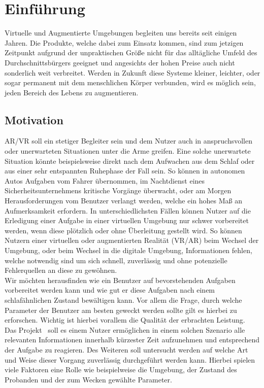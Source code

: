 \chapter{Einführung}

Virtuelle und Augmentierte Umgebungen begleiten uns bereits seit einigen Jahren.  Die Produkte, welche dabei zum Einsatz kommen, sind zum jetzigen Zeitpunkt aufgrund der unpraktischen Größe nicht für das alltägliche Umfeld des Durchschnittsbürgers geeignet und angesichts der hohen Preise auch nicht sonderlich weit verbreitet.
Werden in Zukunft diese Systeme kleiner, leichter, oder sogar permanent mit dem menschlichen Körper verbunden, wird es möglich sein, jeden Bereich des Lebens zu augmentieren. 

\section{Motivation}

AR/VR soll ein stetiger Begleiter sein und dem Nutzer auch in anspruchsvollen oder unerwarteten Situationen unter die Arme greifen.
Eine solche unerwartete Situation könnte beispielsweise direkt nach dem Aufwachen aus dem Schlaf oder aus einer sehr entspannten Ruhephase der Fall sein. So können in autonomen Autos Aufgaben vom Fahrer übernommen, im Nachtdienst eines Sicherheitsunternehmens kritische Vorgänge überwacht, oder am Morgen Herausforderungen vom Benutzer verlangt werden, welche ein hohes Maß an Aufmerksamkeit erfordern. 
In unterschiedlichsten Fällen können Nutzer auf die Erledigung einer Aufgabe in einer virtuellen Umgebung nur schwer vorbereitet werden, wenn diese  plötzlich oder ohne Überleitung gestellt wird.
So können Nutzern einer virtuellen oder augmentierten Realität (VR/AR) beim Wechsel der Umgebung, oder beim Wechsel in die digitale Umgebung, Informationen fehlen, welche notwendig sind um sich schnell, zuverlässig und ohne potenzielle Fehlerquellen an diese zu gewöhnen.\\
Wir möchten herausfinden wie ein Benutzer auf bevorstehenden Aufgaben vorbereitet werden kann und wie gut er diese Aufgaben nach einem schlafähnlichen Zustand bewältigen kann. Vor allem die Frage, durch welche Parameter der Benutzer am besten geweckt werden sollte gilt es hierbei zu erforschen. Wichtig ist hierbei vorallem die Qualität der erbrachten Leistung.\\
Das Projekt \projectName \  soll es einem Nutzer ermöglichen in einem solchen Szenario alle relevanten Informationen innerhalb kürzester Zeit aufzunehmen und entsprechend der Aufgabe zu reagieren. Des Weiteren soll untersucht werden auf welche Art und Weise dieser Vorgang zuverlässig durchgeführt werden kann. Hierbei spielen viele Faktoren eine Rolle wie beispielweise die Umgebung, der Zustand des Probanden und der zum Wecken gewählte Parameter.\\
